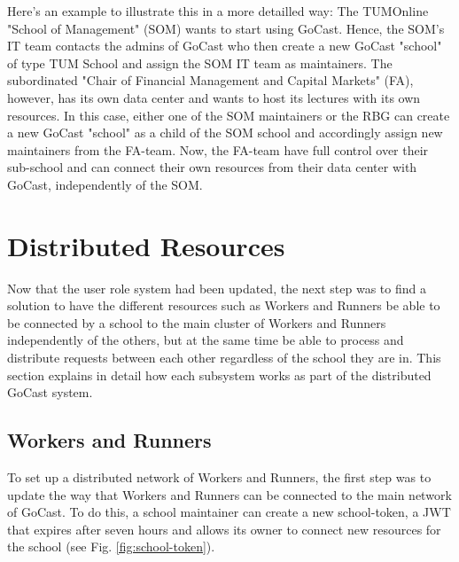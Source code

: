 Here's an example to illustrate this in a more detailled way:
The TUMOnline "School of Management" (SOM) wants to start using GoCast. Hence, the SOM's IT team contacts the admins of GoCast who then create a new GoCast "school" of type TUM School and assign the SOM IT team as maintainers.
The subordinated "Chair of Financial Management and Capital Markets" (FA), however, has its own data center and wants to host its lectures with its own resources. In this case, either one of the SOM maintainers or the RBG can create a new GoCast "school" as a child of the SOM school and accordingly assign new maintainers from the FA-team. Now, the FA-team have full control over their sub-school and can connect their own resources from their data center with GoCast, independently of the SOM.











\section{Distributed Resources}

Now that the user role system had been updated, the next step was to find a solution to have the different resources such as Workers and Runners be able to be connected by a school to the main cluster of Workers and Runners independently of the others, but at the same time be able to process and distribute requests between each other regardless of the school they are in. This section explains in detail how each subsystem works as part of the distributed GoCast system. 

\subsection{Workers and Runners}
To set up a distributed network of Workers and Runners, the first step was to update the way that Workers and Runners can be connected to the main network of GoCast. To do this, a school maintainer can create a new school-token, a \ac{JWT} that expires after seven hours and allows its owner to connect new resources for the school (see Fig. \ref{fig:school-token}).

